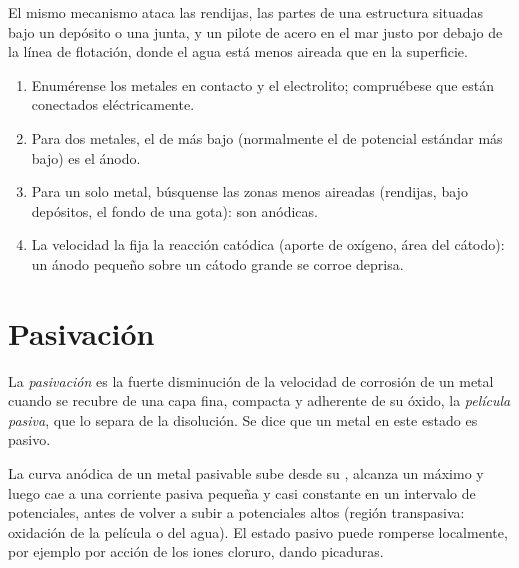 El mismo mecanismo ataca las rendijas, las partes de una estructura situadas bajo un depósito
o una junta, y un pilote de acero en el mar justo por debajo de la línea de flotación, donde
el agua está menos aireada que en la superficie.

\begin{method}\label{met:b2:corrosion:diagnose}
\begin{enumerate}
  \item Enumérense los metales en contacto y el electrolito; compruébese que están
        conectados eléctricamente.
  \item Para dos metales, el de  más bajo (normalmente el de
        potencial estándar más bajo) es el ánodo.
  \item Para un solo metal, búsquense las zonas menos aireadas (rendijas, bajo depósitos,
        el fondo de una gota): son anódicas.
  \item La velocidad la fija la reacción catódica (aporte de oxígeno, área del cátodo):
        un ánodo pequeño sobre un cátodo grande se corroe deprisa.
\end{enumerate}
\end{method}

\section{Pasivación}

\begin{definition}[Pasivación]\label{def:b2:corrosion:passivation}
La \emph{pasivación} es la fuerte disminución de la velocidad de
corrosión de un metal cuando se recubre de una capa fina, compacta y adherente de su
óxido, la \emph{película pasiva}, que lo separa de la
disolución. Se dice que un metal en este estado es pasivo.
\end{definition}

\begin{proposition}\label{prop:b2:corrosion:passivity}
La curva anódica de un metal pasivable sube desde su ,
alcanza un máximo y luego cae a una corriente pasiva pequeña y casi constante en un
intervalo de potenciales, antes de volver a subir a potenciales altos (región
transpasiva: oxidación de la película o del agua). El estado pasivo puede romperse
localmente, por ejemplo por acción de los iones cloruro, dando picaduras.
\end{proposition}


